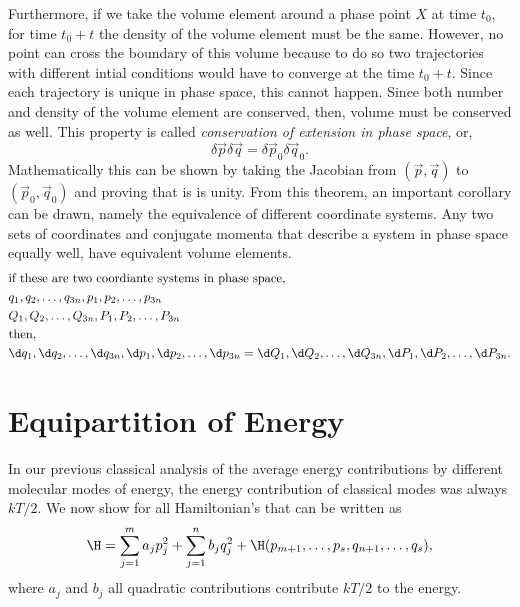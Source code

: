 Furthermore, if we take the volume element around a phase point $X$ at time
$t_{0}$, for time $t_{0} + t$ the density of the volume element must be the
same.  However, no point can cross the boundary of this volume because to do so
two trajectories with different intial conditions would have to converge at the
time $t_{0} + t$. Since each trajectory is unique in phase space, this cannot
happen. Since both number and density of the volume element are conserved, then,
volume must be conserved as well. This property is called \textit{conservation
of extension in phase space}, or,
\begin{equation*}
	\delta \vec{p} \delta \vec{q} = \delta \vec{p}_{0} \delta \vec{q}_{0}.
\end{equation*}
Mathematically this can be shown by taking the Jacobian from $(\vec{p},\vec{q})$
to $(\vec{p}_{0},\vec{q}_{0})$ and proving that is is unity. From this theorem,
an important corollary can be drawn, namely the equivalence of different
coordinate systems. Any two sets of coordinates and conjugate momenta that
describe a system in phase space equally well, have equivalent volume elements.
\begin{align*}
	&\text{if these are two coordiante systems in phase space,}\\
	&q_{1}, q_{2},\ldots,q_{3n},p_{1},p_{2},\ldots,p_{3n}\\
	&Q_{1}, Q_{2},\ldots,Q_{3n},P_{1},P_{2},\ldots,P_{3n}\\
	&\text{then,}\\
	&\d q_{1}, \d q_{2},\ldots,\d q_{3n},\d p_{1},\d p_{2},\ldots,\d p_{3n} =
	\d Q_{1}, \d Q_{2},\ldots,\d Q_{3n},\d P_{1},\d P_{2},\ldots,\d P_{3n}.
\end{align*}

\section{Equipartition of Energy}%
\label{sec:eoe}
In our previous classical analysis of the average energy contributions by
different molecular modes of energy, the energy contribution of classical modes
was always $kT/2$. We now show for all Hamiltonian's that can be written as 
\begin{equation*}
	\H = \sum_{j=1}^{m}{a_{j}p_{j}^{2}} + \sum_{j=1}^{n}{b_{j}q_{j}^{2}} +
	\H(p_{m+1},\ldots, p_{s}, q_{n+1},\ldots,q_{s}),
\end{equation*}
where $a_{j}$ and $ b_{j}$ all quadratic contributions contribute $kT/2 $ to the
energy.

